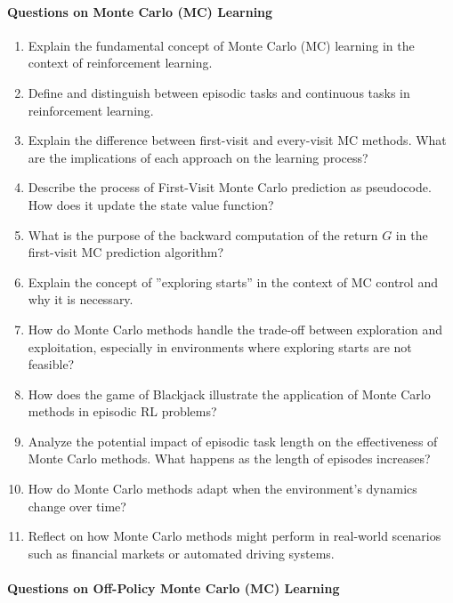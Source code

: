 \paragraph*{Questions on Monte Carlo (MC) Learning}

\begin{enumerate}
\item Explain the fundamental concept of Monte Carlo (MC) learning in the context of reinforcement learning.
\item Define and distinguish between episodic tasks and continuous tasks in reinforcement learning.
\item Explain the difference between first-visit and every-visit MC methods. What are the implications of each approach on the learning process?
\item Describe the process of First-Visit Monte Carlo prediction as pseudocode. How does it update the state value function?
\item What is the purpose of the backward computation of the return $G$ in the first-visit MC prediction algorithm?
\item Explain the concept of ''exploring starts'' in the context of MC control and why it is necessary.
\item How do Monte Carlo methods handle the trade-off between exploration and exploitation, especially in environments where exploring starts are not feasible?
\item How does the game of Blackjack illustrate the application of Monte Carlo methods in episodic RL problems?
\item Analyze the potential impact of episodic task length on the effectiveness of Monte Carlo methods. What happens as the length of episodes increases?
\item How do Monte Carlo methods adapt when the environment's dynamics change over time?
\item Reflect on how Monte Carlo methods might perform in real-world scenarios such as financial markets or automated driving systems.
\end{enumerate}

\paragraph*{Questions on Off-Policy Monte Carlo (MC) Learning}

